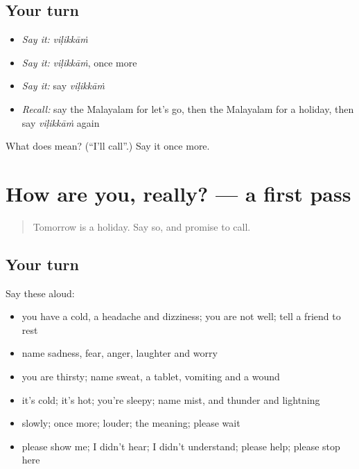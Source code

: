 \subsection*{Your turn}
\begin{itemize}
\raggedright
  \item \emph{Say it:} \emph{viḷikkāṁ}
  \item \emph{Say it:} \emph{viḷikkāṁ}, once more
  \item \emph{Say it:} say \emph{viḷikkāṁ}
  \item \emph{Recall:} say the Malayalam for let's go, then the Malayalam for a holiday, then say \emph{viḷikkāṁ} again
\end{itemize}

\begin{tcolorbox}[breakable,colback=teal!4,colframe=teal!35!black,title={Before you move on}]
What does  mean? (\textquotedblleft{}I'll call\textquotedblright{}.) Say it once more.
\end{tcolorbox}
\section[(dialogue)]{How are you, really? — a first pass}

\label{lesson:ML-R127-first-pass-body-feelings-repair}



\begin{quote}
Tomorrow is a holiday. Say so, and promise to call.
\end{quote}

\subsection*{Your turn}
Say these aloud:

\begin{itemize}
\raggedright
  \item you have a cold, a headache and dizziness; you are not well; tell a friend to rest
  \item name sadness, fear, anger, laughter and worry
  \item you are thirsty; name sweat, a tablet, vomiting and a wound
  \item it's cold; it's hot; you're sleepy; name mist, and thunder and lightning
  \item slowly; once more; louder; the meaning; please wait
  \item please show me; I didn't hear; I didn't understand; please help; please stop here
\end{itemize}

